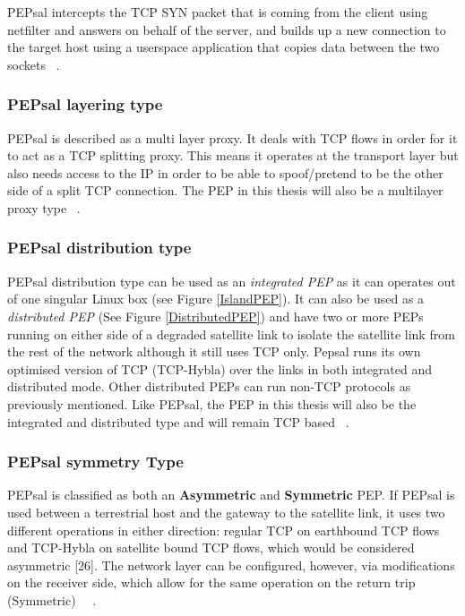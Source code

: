 PEPsal intercepts the TCP SYN packet that is coming from the client using netfilter and answers on behalf of the server, and builds up a new connection to the target host using a userspace application that copies data between the two sockets ~\cite{14}.\\

\subsubsection*{PEPsal layering type}
PEPsal is described as a multi layer proxy. It deals with TCP flows in order for it to act as a TCP splitting proxy. This means it operates at the transport layer but also needs access to the IP in order to be able to spoof/pretend to be the other side of a split TCP connection. The PEP in this thesis will also be a multilayer proxy type ~\cite{14}.\\

\subsubsection*{PEPsal distribution type}
PEPsal distribution type can be used as an \emph{integrated PEP} as it can operates out of one singular Linux box (see Figure \ref{IslandPEP}). It can also be used as a \emph{distributed PEP} (See Figure \ref{DistributedPEP}) and have two or more PEPs running on either side of a degraded satellite link to isolate the satellite link from the rest of the network although it still uses TCP only. Pepsal runs its own optimised version of TCP (TCP-Hybla) over the links in both integrated and distributed mode. Other distributed PEPs can run non-TCP protocols as previously mentioned. Like PEPsal, the PEP in this thesis will also be the integrated and distributed type and will remain TCP based ~\cite{14}. \\

\subsubsection*{PEPsal symmetry Type}
PEPsal is classified as both an \textbf{Asymmetric} and \textbf{Symmetric} PEP. If PEPsal is used between a terrestrial host and the gateway to the satellite link, it uses two different operations in either direction: regular TCP on earthbound TCP flows and TCP-Hybla on satellite bound TCP flows, which would be considered asymmetric [26]. The network layer can be configured, however, via modifications on the receiver side, which allow for the same operation on the return trip (Symmetric) ~\cite{6}~\cite{14}.\\

